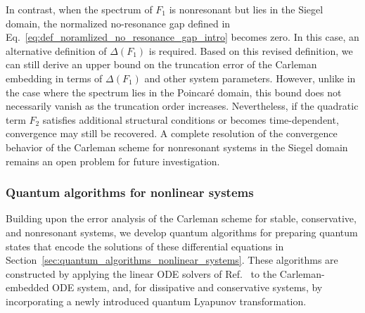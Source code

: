 \documentclass[superscriptaddress,onecolumn,nofootinbib,longbibliography,a4paper,accepted=2026-09-29]{quantumarticle}
\theoremstyle{plain}
\theoremstyle{definition}
\numberwithin{thm}{section}
\numberwithin{assumption}{section}
\numberwithin{lemma}{section}
\numberwithin{prop}{section}
\numberwithin{cor}{section}
\numberwithin{definition}{section}
\numberwithin{rmk}{section}
\numberwithin{equation}{section}
\begin{document}
In contrast, when the spectrum of $F_1$ is nonresonant but lies in the Siegel domain, the normalized no-resonance gap defined in Eq.~\eqref{eq:def_noramlized_no_resonance_gap_intro} becomes zero. In this case, an alternative definition of $\Delta(F_1)$ is required. Based on this revised definition, we can still  derive an upper bound on the truncation error of the Carleman embedding in terms of $\Delta(F_1)$ and other system parameters.
However, unlike in the case where the spectrum lies in the  Poincar\'{e} domain, this bound does not necessarily vanish as the truncation order increases. Nevertheless, if the quadratic term $F_2$ satisfies additional structural conditions or becomes time-dependent, convergence may still be recovered. A complete resolution of the convergence behavior of the Carleman scheme for nonresonant systems in the Siegel domain remains an open problem for future investigation.

 
\subsubsection{Quantum algorithms for nonlinear systems}

Building upon the error analysis of the Carleman scheme for stable, conservative, and nonresonant systems, we develop quantum algorithms for preparing quantum states that encode the solutions of these differential equations in Section~\ref{sec:quantum_algorithms_nonlinear_systems}. These algorithms are constructed by applying the linear ODE solvers of Ref.~\cite{jennings2023cost, berry2024quantum} to the Carleman-embedded ODE system, and, for dissipative and conservative systems, by incorporating a newly introduced quantum Lyapunov transformation.
\end{document}
